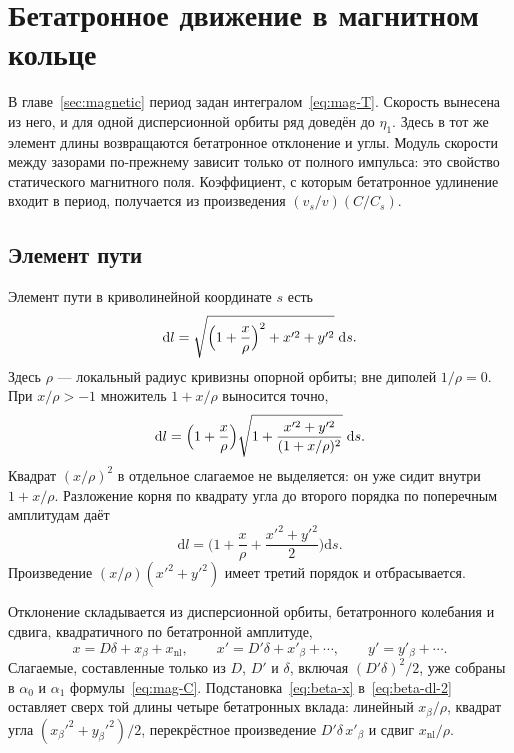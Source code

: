 \section{Бетатронное движение в магнитном кольце}
\label{sec:ch2}

В главе~\ref{sec:magnetic} период задан интегралом~\eqref{eq:mag-T}. Скорость вынесена из него, и для одной дисперсионной орбиты ряд доведён до $\eta_1$. Здесь в тот же элемент длины возвращаются бетатронное отклонение и углы. Модуль скорости между зазорами по-прежнему зависит только от полного импульса: это свойство статического магнитного поля. Коэффициент, с которым бетатронное удлинение входит в период, получается из произведения $(v_s/v)(C/C_s)$.

\subsection{Элемент пути}
\label{sec:ch2-dl}

Элемент пути в криволинейной координате $s$ есть
\begin{equation}
\label{eq:beta-dl}
\mathrm{d}l
=\sqrt{\Bigl(1+\frac{x}{\rho}\Bigr)^2+x'^2+y'^2}\;\mathrm{d}s.
\end{equation}
Здесь $\rho$ --- локальный радиус кривизны опорной орбиты; вне диполей $1/\rho=0$. При $x/\rho>-1$ множитель $1+x/\rho$ выносится точно,
\begin{equation}
\label{eq:beta-dl-factor}
\mathrm{d}l
=\Bigl(1+\frac{x}{\rho}\Bigr)
\sqrt{1+\frac{x'^2+y'^2}{(1+x/\rho)^2}}\;\mathrm{d}s.
\end{equation}
Квадрат $(x/\rho)^2$ в отдельное слагаемое не выделяется: он уже сидит внутри $1+x/\rho$. Разложение корня по квадрату угла до второго порядка по поперечным амплитудам даёт
\begin{equation}
\label{eq:beta-dl-2}
\mathrm{d}l
=\Biggl(1+\frac{x}{\rho}+\frac{x'^2+y'^2}{2}\Biggr)\mathrm{d}s.
\end{equation}
Произведение $(x/\rho)(x'^2+y'^2)$ имеет третий порядок и отбрасывается.

Отклонение складывается из дисперсионной орбиты, бетатронного колебания и сдвига, квадратичного по бетатронной амплитуде,
\begin{equation}
\label{eq:beta-x}
x=D\delta+x_\beta+x_{\mathrm{nl}},
\qquad
x'=D'\delta+x'_\beta+\cdots,
\qquad
y'=y'_\beta+\cdots.
\end{equation}
Слагаемые, составленные только из $D$, $D'$ и $\delta$, включая $(D'\delta)^2/2$, уже собраны в $\alpha_0$ и $\alpha_1$ формулы~\eqref{eq:mag-C}. Подстановка~\eqref{eq:beta-x} в~\eqref{eq:beta-dl-2} оставляет сверх той длины четыре бетатронных вклада: линейный $x_\beta/\rho$, квадрат угла $(x_\beta'^2+y_\beta'^2)/2$, перекрёстное произведение $D'\delta\,x'_\beta$ и сдвиг $x_{\mathrm{nl}}/\rho$.

